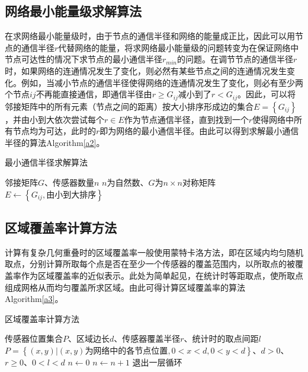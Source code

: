\documentclass[a4paper]{ctexart}
\begin{document}
\begin{spacing}{1}
		\subsection{网络最小能量级求解算法}
		在求网络最小能量级时，由于节点的通信半径和网络的能量成正比，因此可以用节点的通信半径$r$代替网络的能量，将求网络最小能量级的问题转变为在保证网络中节点可达性的情况下求节点的最小通信半径$r_{min}$的问题。在调节节点的通信半径$r$时，如果网络的连通情况发生了变化，则必然有某些节点之间的连通情况发生变化。例如，当减小节点的通信半径使得网络的连通情况发生了变化，则必有至少两个节点$ij$不再能直接通信，即通信半径由$r\ge G_{ij}$减小到了$r<G_{ij}$。因此，可以将邻接矩阵中的所有元素（节点之间的距离）按大小排序形成边的集合$E=\left\{G_{ij}\right\}$，并由小到大依次尝试每个$r\in E$作为节点通信半径，直到找到一个$r$使得网络中所有节点均为可达，此时的$r$即为网络的最小通信半径。由此可以得到求解最小通信半径的算法Algorithm\ref{a2}。
		\begin{algorithm}[htbp]
			\caption{最小通信半径求解算法}
			\label{a2}
			\begin{algorithmic}[1]
				\Require 邻接矩阵$G$、传感器数量$n$
				\Ensure $n$为自然数、$G$为$n\times n$对称矩阵
				\State $E\gets\left\{G_{ij},\text{由小到大排序}\right\}$
				\State {}
				\EndIf
				\EndFor
				\EndFunction
			\end{algorithmic}
		\end{algorithm}

		\subsection{区域覆盖率计算方法}
		计算有复杂几何重叠时的区域覆盖率一般使用蒙特卡洛方法，即在区域内均匀随机取点，分别计算所取每个点是否在至少一个传感器的覆盖范围内，以所取点的被覆盖率作为区域覆盖率的近似表示。此处为简单起见，在统计时等距取点，使所取点组成网格从而均匀覆盖所求区域。由此可得计算区域覆盖率的算法Algorithm\ref{a3}。
		\begin{algorithm}[htbp]
			\caption{区域覆盖率计算方法}
			\label{a3}
			\begin{algorithmic}[1]
				\Require 传感器位置集合$P$、区域边长$d$、传感器覆盖半径$r$、统计时的取点间距$l$
				\Ensure $P=\left\{(x,y)|(x,y)\text{为网络中的各节点位置},0<x<d,0<y<d\right\}$、$d>0$、$r\ge 0$、$0<l<d$
				\State $n\gets 0$
				\State $n\gets n+1$
				\State 退出一层循环
				\EndIf
				\EndFor
				\EndFor
				\EndFor
				\State {}
				\EndFunction
			\end{algorithmic}
		\end{algorithm}


\end{spacing}
\end{document}

